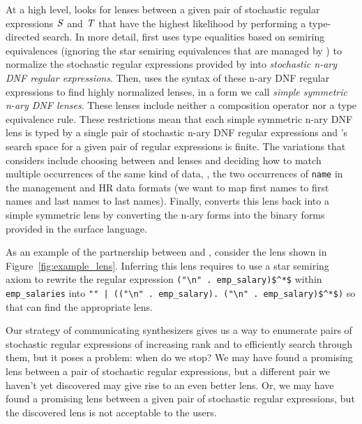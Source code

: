 \documentclass[acmsmall,screen,anonymous]{acmart}
\begin{document}
At a high level, \GreedySynth looks for lenses between a given pair of
stochastic regular expressions $\mathit{S}$ and $\mathit{T}$ that have the
highest likelihood by performing a type-directed search. 
In more detail, \GreedySynth first uses type equalities based on semiring 
equivalences (ignoring the star semiring equivalences that are managed
by \RXSearch) to normalize the
stochastic regular expressions provided by \RXSearch into 
\emph{stochastic n-ary DNF regular expressions}.  
Then, \GreedySynth uses the syntax of these n-ary DNF regular
expressions to find highly normalized lenses, in a
form we call \emph{simple symmetric n-ary DNF lenses}.  These lenses include
neither a composition operator nor a type equivalence rule.  These
restrictions mean that each simple symmetric n-ary DNF lens is typed
by a single pair of stochastic n-ary DNF regular expressions and 
\GreedySynth's search space for a given pair of regular expressions is
finite.  The variations that \GreedySynth 
considers include choosing between \IdentityLens{} and  \Disconnect
lenses and deciding how to match multiple occurrences of the same kind
of data, \EG, the two occurrences of \lstinline{name} in the
management and HR data formats (we want to map first names to first
names and last names to last names). 
Finally, \GreedySynth converts this lens 
back into a simple symmetric lens by converting the n-ary forms into
the binary forms provided in the surface language.  

As an example of the partnership between \RXSearch and \GreedySynth,
consider the lens shown in Figure~\ref{fig:example_lens}. 
Inferring this lens requires \RXSearch to use a star semiring axiom to
rewrite the regular expression \lstinline{("\n" . emp_salary)$^*$} within
\lstinline{emp_salaries} into 
\lstinline{"" | (("\n" . emp_salary). ("\n" . emp_salary)$^*$)} 
so that \GreedySynth can find the appropriate lens.  

Our strategy of communicating synthesizers gives us a way to
enumerate pairs of stochastic regular expressions of increasing
rank and to efficiently search through them, but it poses a
problem: when do we stop? We may have found a promising lens
between a pair of stochastic regular expressions, but a different 
pair we haven't yet discovered may give rise to an even better lens. 
Or, we may have found a promising lens between a given pair of
stochastic regular expressions, but the discovered lens is not 
acceptable to the users. 
\end{document}
